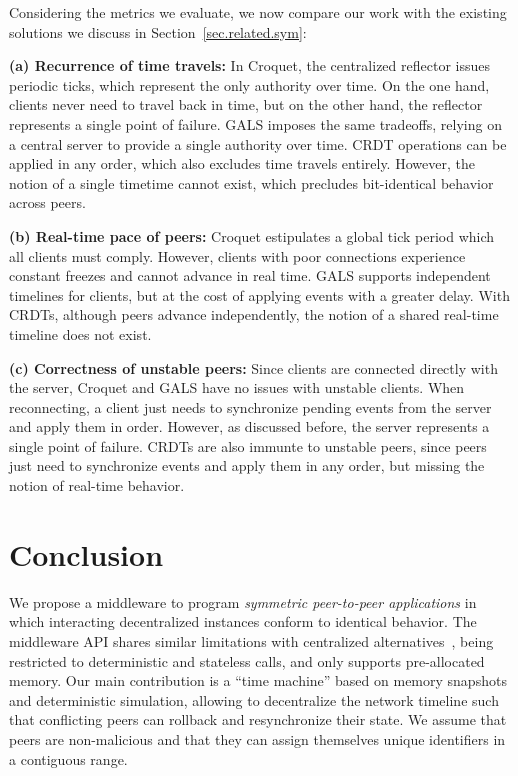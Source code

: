 \documentclass[fleqn,10pt]{SelfArx}
\begin{document}
Considering the metrics we evaluate, we now compare our work with the existing
solutions we discuss in Section~\ref{sec.related.sym}:

\textbf{(a) Recurrence of time travels:}
In Croquet, the centralized reflector issues periodic ticks, which represent
the only authority over time.
On the one hand, clients never need to travel back in time, but on the other
hand, the reflector represents a single point of failure.
%
GALS imposes the same tradeoffs, relying on a central server to provide a
single authority over time.
%
CRDT operations can be applied in any order, which also excludes time travels
entirely.
However, the notion of a single timetime cannot exist, which precludes
bit-identical behavior across peers.

\textbf{(b) Real-time pace of peers:}
Croquet estipulates a global tick period which all clients must comply.
However, clients with poor connections experience constant freezes and cannot
advance in real time.
%
GALS supports independent timelines for clients, but at the cost of applying
events with a greater delay.
%
With CRDTs, although peers advance independently, the notion of a shared
real-time timeline does not exist.

\textbf{(c) Correctness of unstable peers:}
Since clients are connected directly with the server, Croquet and GALS have no
issues with unstable clients.
When reconnecting, a client just needs to synchronize pending events from the
server and apply them in order.
However, as discussed before, the server represents a single point of failure.
%
CRDTs are also immunte to unstable peers, since peers just need to synchronize
events and apply them in any order, but missing the notion of real-time
behavior.

\section{Conclusion}
\label{sec.conclusion}

We propose a middleware to program \emph{symmetric peer-to-peer applications}
in which interacting decentralized instances conform to identical behavior.
%
The middleware API shares similar limitations with centralized
alternatives~\cite{gals,croquet}, being restricted to deterministic and
stateless calls, and only supports pre-allocated memory.
%
Our main contribution is a ``time machine'' based on memory snapshots and
deterministic simulation, allowing to decentralize the network timeline such
that conflicting peers can rollback and resynchronize their state.
%
We assume that peers are non-malicious and that they can assign themselves
unique identifiers in a contiguous range.
\end{document}
